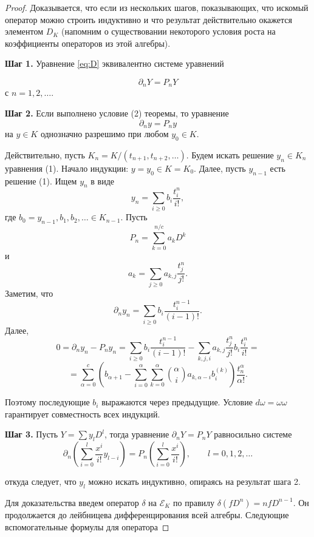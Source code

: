 \documentclass{article}
\theoremstyle{definition}
\theoremstyle{definition} %
\theoremstyle{remark}     %
\theoremstyle{definition}
\theoremstyle{definition}
\theoremstyle{definition}
\theoremstyle{definition}
\theoremstyle{definition}
\theoremstyle{definition}
\theoremstyle{definition}
\theoremstyle{definition}
\begin{document}
\begin{proof}
  Доказывается, что если из нескольких шагов, показывающих, что искомый оператор можно строить индуктивно и что результат действительно окажется элементом \( D_K \) (напомним о существовании некоторого условия роста на коэффициенты операторов из этой алгебры).

  \textbf{Шаг 1.} Уравнение \ref{eq:D} эквивалентно системе уравнений
  

    \begin{equation*}
        \partial_n Y = P_n Y \tag*{$(D)_n$}
    \end{equation*}
  с \( n = 1, 2, \dots \).

  \textbf{Шаг 2.} Если выполнено условие (2) теоремы, то уравнение
  \[
    \partial_n y = P_n y \tag{1}
  \]
  на \( y \in K \) однозначно разрешимо при любом \( y_0 \in K \).

  Действительно, пусть \( K_n = K / (t_{n+1}, t_{n+2}, \dots) \). Будем искать решение \( y_n \in K_n \) уравнения (1). Начало индукции: \( y = y_0 \in K = K_0 \). Далее, пусть \( y_{n-1} \) есть решение (1). Ищем \( y_n \) в виде
  \[
    y_n = \sum_{i \geq 0} b_i \frac{t_i^n}{i!},
  \]
  где \( b_0 = y_{n-1}, b_1, b_2, \dots \in K_{n-1} \). Пусть
  \[
    P_n = \sum_{k=0}^{n/c} a_k D^k
  \]
  и
  \[
    a_k = \sum_{j \geq 0} a_{k,j} \frac{t_j^n}{j!}.
  \]
  Заметим, что
  \[
    \partial_n y_n = \sum_{i \geq 0} b_i \frac{t_i^{n-1}}{(i-1)!}.
  \]
  Далее,
  \[
    0 = \partial_n y_n - P_n y_n = \sum_{i \geq 0} b_i \frac{t_i^{n-1}}{(i-1)!} - \sum_{k,j,i} a_{k,j} \frac{t_j^n}{j!} b_i \frac{t_i^n}{i!} =
  \]
  \[
    = \sum_{\alpha=0}^c \left( b_{\alpha+1} - \sum_{i=0}^{\alpha} \sum_{k=0}^{\alpha} \binom{\alpha}{i} a_{k,\alpha-i} b_i^{(k)} \right) \frac{t_n^\alpha}{\alpha!}.
  \]


Поэтому последующие \( b_i \) выражаются через предыдущие. Условие \( d\omega = \omega\omega \) гарантирует совместность всех индукций.

\textbf{Шаг 3.} Пусть \( Y = \sum y_l D^l \), тогда уравнение \( \partial_n Y = P_n Y \) равносильно системе
\[
\partial_n \left( \sum_{i=0}^l \frac{x^i}{i!} y_{l-i} \right) = P_n \left( \sum_{i=0}^l \frac{x^i}{i!} \right), \qquad l = 0, 1, 2, \dots
\]

откуда следует, что \( y_l \) можно искать индуктивно, опираясь на результат шага 2.

Для доказательства введем оператор \(\delta\) на \(\mathcal{E}_K\) по правилу \(\delta(fD^n) = nfD^{n-1}\).  
Он продолжается до лейбницева дифференцирования всей алгебры. Следующие вспомогательные формулы для оператора  


\end{proof}
\end{document}
